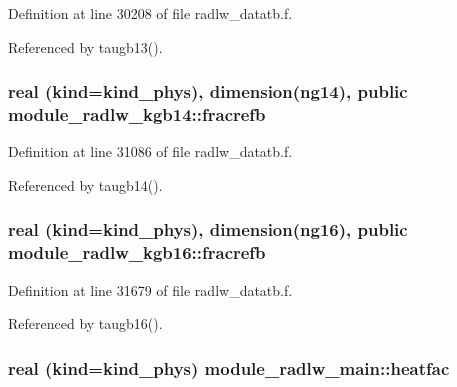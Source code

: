 Definition at line 30208 of file radlw\+\_\+datatb.\+f.



Referenced by taugb13().

\subsubsection[{\texorpdfstring{fracrefb}{fracrefb}}]{\setlength{\rightskip}{0pt plus 5cm}real (kind=kind\+\_\+phys), dimension(ng14), public module\+\_\+radlw\+\_\+kgb14\+::fracrefb}\hypertarget{group__module__radlw__main_ga13a211bf8a903d0720fa72ac90e4fc3f}{}\label{group__module__radlw__main_ga13a211bf8a903d0720fa72ac90e4fc3f}


Definition at line 31086 of file radlw\+\_\+datatb.\+f.



Referenced by taugb14().

\subsubsection[{\texorpdfstring{fracrefb}{fracrefb}}]{\setlength{\rightskip}{0pt plus 5cm}real (kind=kind\+\_\+phys), dimension(ng16), public module\+\_\+radlw\+\_\+kgb16\+::fracrefb}\hypertarget{group__module__radlw__main_gab93affafac8e2bb182982133a6449de4}{}\label{group__module__radlw__main_gab93affafac8e2bb182982133a6449de4}


Definition at line 31679 of file radlw\+\_\+datatb.\+f.



Referenced by taugb16().

\subsubsection[{\texorpdfstring{heatfac}{heatfac}}]{\setlength{\rightskip}{0pt plus 5cm}real (kind=kind\+\_\+phys) module\+\_\+radlw\+\_\+main\+::heatfac\hspace{0.3cm}{\ttfamily [private]}}\hypertarget{group__module__radlw__main_ga75ff8e29e21f0d07684d4a09c744daec}{}\label{group__module__radlw__main_ga75ff8e29e21f0d07684d4a09c744daec}


